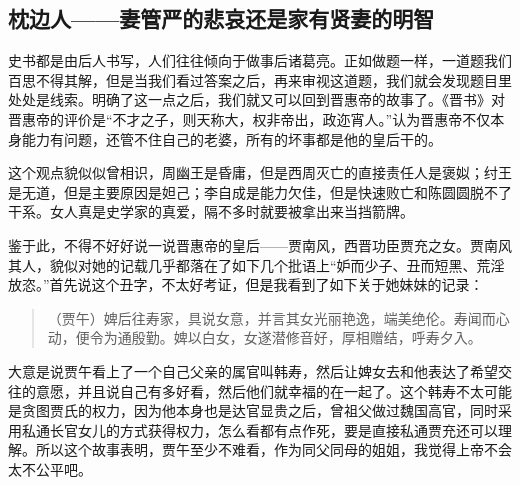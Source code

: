\documentclass[
]{book}
\begin{document}
\hypertarget{ux6795ux8fb9ux4ebaux59bbux7ba1ux4e25ux7684ux60b2ux54c0ux8fd8ux662fux5bb6ux6709ux8d24ux59bbux7684ux660eux667a}{%
\subsection{枕边人------妻管严的悲哀还是家有贤妻的明智}\label{ux6795ux8fb9ux4ebaux59bbux7ba1ux4e25ux7684ux60b2ux54c0ux8fd8ux662fux5bb6ux6709ux8d24ux59bbux7684ux660eux667a}}

史书都是由后人书写，人们往往倾向于做事后诸葛亮。正如做题一样，一道题我们百思不得其解，但是当我们看过答案之后，再来审视这道题，我们就会发现题目里处处是线索。明确了这一点之后，我们就又可以回到晋惠帝的故事了。《晋书》对晋惠帝的评价是``不才之子，则天称大，权非帝出，政迩宵人。''认为晋惠帝不仅本身能力有问题，还管不住自己的老婆，所有的坏事都是他的皇后干的。

这个观点貌似似曾相识，周幽王是昏庸，但是西周灭亡的直接责任人是褒姒；纣王是无道，但是主要原因是妲己；李自成是能力欠佳，但是快速败亡和陈圆圆脱不了干系。女人真是史学家的真爱，隔不多时就要被拿出来当挡箭牌。

鉴于此，不得不好好说一说晋惠帝的皇后------贾南风，西晋功臣贾充之女。贾南风其人，貌似对她的记载几乎都落在了如下几个批语上``妒而少子、丑而短黑、荒淫放恣。''首先说这个丑字，不太好考证，但是我看到了如下关于她妹妹的记录：

\begin{quote}
（贾午）婢后往寿家，具说女意，并言其女光丽艳逸，端美绝伦。寿闻而心动，便令为通殷勤。婢以白女，女遂潜修音好，厚相赠结，呼寿夕入。
\end{quote}

大意是说贾午看上了一个自己父亲的属官叫韩寿，然后让婢女去和他表达了希望交往的意愿，并且说自己有多好看，然后他们就幸福的在一起了。这个韩寿不太可能是贪图贾氏的权力，因为他本身也是达官显贵之后，曾祖父做过魏国高官，同时采用私通长官女儿的方式获得权力，怎么看都有点作死，要是直接私通贾充还可以理解。所以这个故事表明，贾午至少不难看，作为同父同母的姐姐，我觉得上帝不会太不公平吧。
\end{document}
